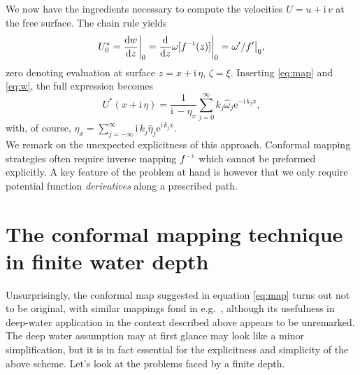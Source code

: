 \documentclass[a4paper,12pt]{article}
\newcommand{\mr}{\mathrm}
\newcommand{\ii}{\mr{i}\,}
\newcommand{\ee}{\mr{e}}
\renewcommand{\_}[1]{_\mr{#1}}
\newcommand{\w}{w}
\newcommand{\h}{\hat}
\newcommand{\z}{z}
\newcommand{\x}{x}
\newcommand{\zz}{\zeta}
\newcommand{\xx}{\xi}
\newcommand{\zmap}{f}
\newcommand{\zzmap}{\zmap^{\raisebox{.2ex}{$\scriptscriptstyle-1$}}}
\newcommand{\ww}{\omega}
\renewcommand{\w}{w}
\newcommand{\surf}{\eta}
\newcommand{\dd}[2]{\frac{\mr d #1}{\mr d #2}}
\begin{document}
We now have the ingredients necessary to compute the velocities $U=u+\ii v$ at the free surface. 
The chain rule yields
\begin{equation*}
U_0^* = \dd{\w}{\z}\bigg|_{0} = \dd{}{\z}\ww[\zzmap(\z)]\bigg|_0 = \ww'/\zmap' \big|_0,
\end{equation*}
zero denoting evaluation at surface $\z=\x+\ii\surf$, $\zz=\xx$.
Inserting \eqref{eq:map} and \eqref{eq:w}, the full expression becomes
\begin{equation}
U^*(\x+\ii\surf) = \frac{1}{\ii- \surf_{\x}}\sum_{j=0}^\infty  k_j \h\ww_j \ee^{-\ii k_j \x},
\label{eq:U}
\end{equation}
with, of course, $\surf_\x=\sum_{j=-\infty}^\infty\ii k_j\h\surf_j\ee^{\ii k_j \x}$.
\\

We remark on the unexpected explicitness of this approach. 
Conformal mapping strategies often require inverse mapping $\zzmap$ which cannot be preformed explicitly. 
A key feature of the problem at hand is however that we only require potential function \textit{derivatives} along a prescribed path.






\section{The conformal mapping technique in finite water depth}
\label{sec:H}
Unsurprisingly, the conformal map suggested in equation \eqref{eq:map} turns out not to be original, with similar mappings fond in e.g.~\citet{chalikov2005modeling}, although its usefulness in deep-water application in the context described above appears to be unremarked.
The deep water assumption may at first glance may look like a minor simplification, but it is in fact essential for the explicitness and simplicity of the above scheme. 
Let's look at the problems faced by a finite depth.
\\
\end{document}
